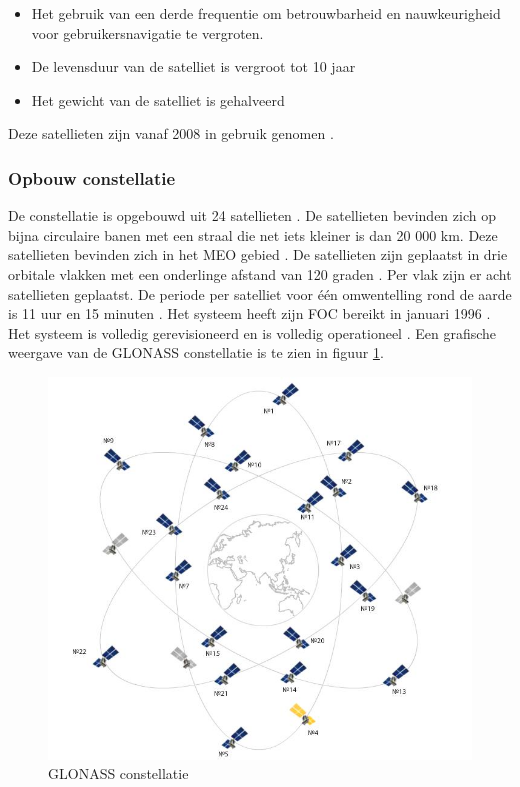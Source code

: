 \begin{itemize}
	\item Het gebruik van een derde frequentie om betrouwbarheid en nauwkeurigheid voor gebruikersnavigatie te vergroten.
	\item De levensduur van de satelliet is vergroot tot 10 jaar
	\item Het gewicht van de satelliet is gehalveerd
\end{itemize}
Deze satellieten zijn vanaf 2008 in gebruik genomen \cite{LBibPPP}.

\subsubsection{Opbouw constellatie} 
De constellatie is opgebouwd uit 24 satellieten \cite{LBibGNSS4}. De satellieten bevinden zich op bijna circulaire banen met een straal die net iets kleiner is dan 20 000 km. Deze satellieten bevinden zich in het MEO gebied \cite{LBibMEO}. De satellieten zijn geplaatst in drie orbitale vlakken met een onderlinge afstand van 120 graden \cite{LBibGLONASS2,LBibGNSS6, LBibGNSS8}. Per vlak zijn er acht satellieten geplaatst. De periode per satelliet voor \'e\'en omwentelling rond de aarde is 11 uur en 15 minuten \cite{LBibGNSS6}.  Het systeem heeft zijn FOC bereikt in januari 1996 \cite{LBibGLONASS}. Het systeem is volledig gerevisioneerd en is volledig operationeel \cite{LBibGNSS4}. Een grafische weergave van de GLONASS constellatie is te zien in figuur \ref{imgGLONASS}.

\begin{figure}[hpb]
	\includegraphics[scale=0.5]{GLONASS.jpg}
	\caption{GLONASS constellatie \cite{LImgGLONASS}}
	\label{imgGLONASS}
\end{figure}

